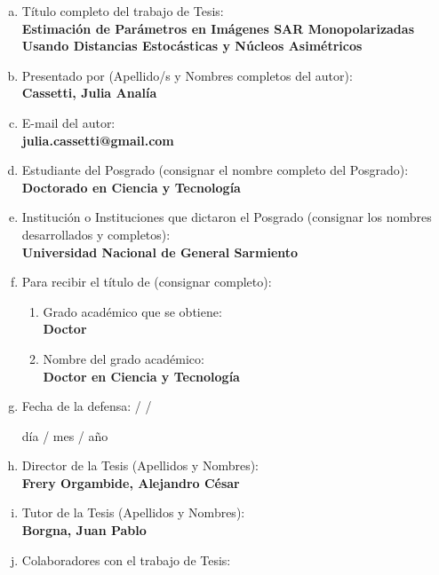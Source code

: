\bigskip
\begin{enumerate}[a)]
	\item Título completo del trabajo de Tesis: \\
	\textbf{Estimación de Parámetros en Imágenes SAR Monopolarizadas Usando Distancias Estocásticas y Núcleos Asimétricos}
	
	\item Presentado por (Apellido/s y Nombres completos del autor): \\
	\textbf{Cassetti, Julia Analía}
	
	\item E-mail del autor: \\
	\textbf{julia.cassetti@gmail.com}
	
	\item Estudiante del Posgrado (consignar el nombre completo del Posgrado): 
	\textbf{Doctorado en Ciencia y Tecnología}
	
	\item Institución o Instituciones que dictaron el Posgrado (consignar los nombres
	desarrollados y completos): \\
	\textbf{Universidad Nacional de General Sarmiento}
	
	\item Para recibir el título de (consignar completo):
	
	\begin{enumerate}%
		\item Grado académico que se obtiene: \\
		\textbf{Doctor}
		\item Nombre del grado académico: \\
		\textbf{Doctor en Ciencia y Tecnología}
	\end{enumerate}
	
	\item Fecha de la defensa:   \qquad  / \qquad / \quad   
	 
	\qquad \qquad \qquad \qquad \quad día / mes / año
	
	\item Director de la Tesis (Apellidos y Nombres): \\
	\textbf{Frery Orgambide, Alejandro César}
	
	\item Tutor de la Tesis (Apellidos y Nombres): \\
	\textbf{Borgna, Juan Pablo}
	
	\item Colaboradores con el trabajo de Tesis: 
	

\end{enumerate}
